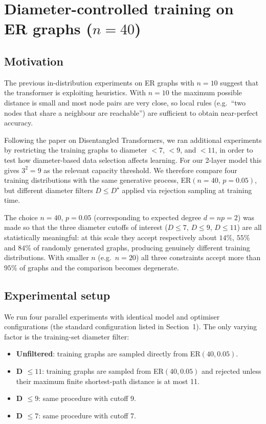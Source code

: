\documentclass[11pt,a4paper]{article}
\begin{document}
\vspace{10em}

\section{Diameter-controlled training on ER graphs (\(n = 40\))}
\label{sec:n40}

\subsection{Motivation}

The previous in-distribution experiments on ER graphs with \(n = 10\) suggest that the transformer is exploiting 
heuristics. With \(n = 10\) the maximum possible distance is small and most node pairs are very close, so local 
rules (e.g.\ ``two nodes that share a neighbour are reachable'') are sufficient to obtain near-perfect accuracy.

Following the paper on Disentangled Transformers, we ran additional experiments by restricting the training graphs 
to diameter \(<7\), \(<9\), and \(<11\), in order to test how diameter-based data selection affects learning. For 
our 2-layer model this gives \(3^2 = 9\) as the relevant capacity threshold. We therefore compare four training 
distributions with the same generative process, ER\((n=40,\, p=0.05)\), but different diameter filters \(D \le D^\star\) 
applied via rejection sampling at training time.

The choice \(n = 40\), \(p = 0.05\) (corresponding to expected degree \(d = np = 2\)) was made so that the three diameter 
cutoffs of interest (\(D \le 7\), \(D \le 9\), \(D \le 11\)) are all statistically meaningful: at this scale they accept 
respectively about \(14\%\), \(55\%\) and \(84\%\) of randomly generated graphs, producing genuinely different training 
distributions. With smaller \(n\) (e.g.\ \(n = 20\)) all three constraints accept more than \(95\%\) of graphs and the 
comparison becomes degenerate.

\subsection{Experimental setup}

We run four parallel experiments with identical model and optimiser configurations (the standard configuration listed 
in Section~1). The only varying factor is the training-set diameter filter:

\begin{itemize}
    \item \textbf{Unfiltered}: training graphs are sampled directly from ER\((40, 0.05)\).
    \item \textbf{D \(\le 11\)}: training graphs are sampled from ER\((40, 0.05)\) and rejected unless their maximum 
    finite shortest-path distance is at most 11.
    \item \textbf{D \(\le 9\)}: same procedure with cutoff 9.
    \item \textbf{D \(\le 7\)}: same procedure with cutoff 7.
\end{itemize}
\end{document}
